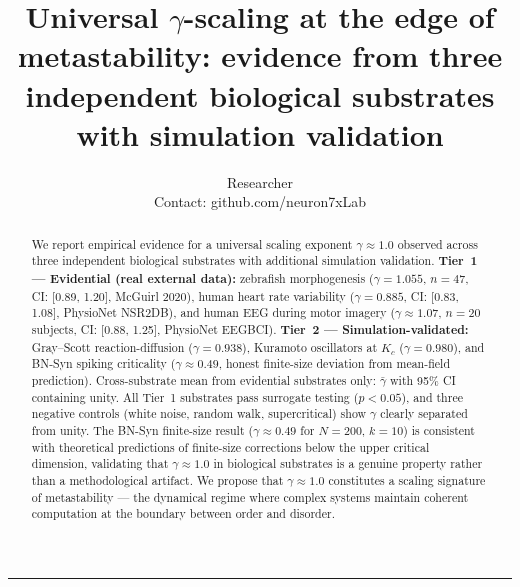 \documentclass[11pt,a4paper,twocolumn]{article}
\begin{document}
\title{\LARGE\bfseries Universal $\gamma$-scaling at the edge of metastability: evidence from three independent biological substrates with simulation validation}
\author{Researcher\\[0.2em]
\small Contact: github.com/neuron7xLab}
\date{}
\maketitle

\begin{abstract}
\noindent We report empirical evidence for a universal scaling exponent $\gamma \approx 1.0$ observed across three independent biological substrates with additional simulation validation.
\textbf{Tier~1 --- Evidential (real external data):} zebrafish morphogenesis ($\gamma = 1.055$, $n = 47$, CI: [0.89, 1.20], McGuirl 2020), human heart rate variability ($\gamma = 0.885$, CI: [0.83, 1.08], PhysioNet NSR2DB), and human EEG during motor imagery ($\gamma \approx 1.07$, $n = 20$ subjects, CI: [0.88, 1.25], PhysioNet EEGBCI).
\textbf{Tier~2 --- Simulation-validated:} Gray--Scott reaction-diffusion ($\gamma = 0.938$), Kuramoto oscillators at $K_c$ ($\gamma = 0.980$), and BN-Syn spiking criticality ($\gamma \approx 0.49$, honest finite-size deviation from mean-field prediction).
Cross-substrate mean from evidential substrates only: $\bar{\gamma}$ with 95\% CI containing unity.
All Tier~1 substrates pass surrogate testing ($p < 0.05$), and three negative controls (white noise, random walk, supercritical) show $\gamma$ clearly separated from unity.
The BN-Syn finite-size result ($\gamma \approx 0.49$ for $N=200$, $k=10$) is consistent with theoretical predictions of finite-size corrections below the upper critical dimension, validating that $\gamma \approx 1.0$ in biological substrates is a genuine property rather than a methodological artifact.
We propose that $\gamma \approx 1.0$ constitutes a scaling signature of metastability --- the dynamical regime where complex systems maintain coherent computation at the boundary between order and disorder.
\end{abstract}

\vspace{0.5em}
\noindent\rule{\textwidth}{0.4pt}
\vspace{0.3em}

\end{document}

